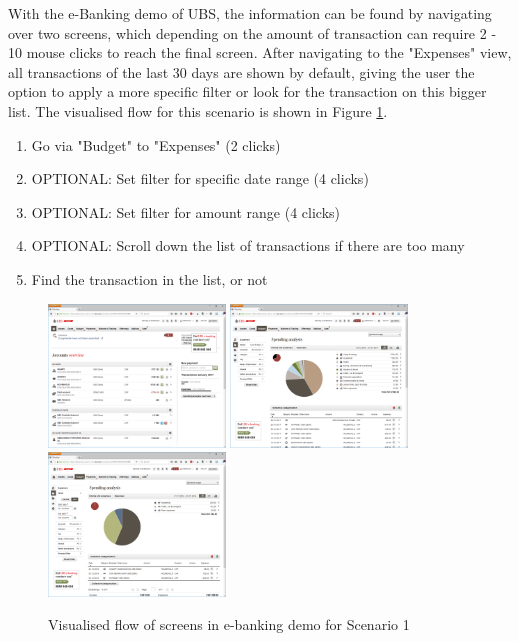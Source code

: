 With the e-Banking demo of UBS, the information can be found by navigating over two screens, which depending on the amount of transaction can require 2 - 10 mouse clicks to reach the final screen. After navigating to the "Expenses" view, all transactions of the last 30 days are shown by default, giving the user the option to apply a more specific filter or look for the transaction on this bigger list. The visualised flow for this scenario is shown in Figure \ref{fig:scenariooneebanking}.
\begin{enumerate}
	\item Go via "Budget" to "Expenses" (2 clicks)
	\item OPTIONAL: Set filter for specific date range (4 clicks)
	\item OPTIONAL: Set filter for amount range (4 clicks)
	\item OPTIONAL: Scroll down the list of transactions if there are too many
	\item Find the transaction in the list, or not
\end{enumerate}
\begin{figure}[h]
	\begin{center}
		\includegraphics[width=4.7cm]{03_Figures/09_Evaluation/UBS_1_Overview.png}
		\includegraphics[width=4.7cm]{03_Figures/09_Evaluation/UBS_2_SpendingAnalysis.png}
		\includegraphics[width=4.7cm]{03_Figures/09_Evaluation/UBS_2_SpendingAnalysis_Filter.png}
		\caption{Visualised flow of screens in e-banking demo for Scenario 1}
		\label{fig:scenariooneebanking}
	\end{center}
\end{figure}


